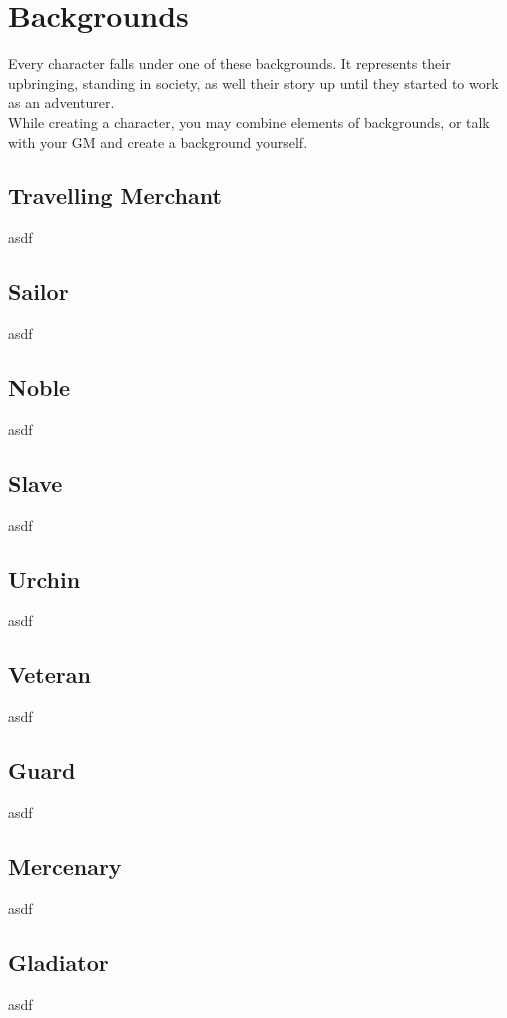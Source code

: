\chapter{Backgrounds}
Every character falls under one of these backgrounds. It represents their upbringing, standing in society, as well their story up until they started to work as an adventurer. \\
While creating a character, you may combine elements of backgrounds, or talk with your GM and create a background yourself.\\

\section{Travelling Merchant}
asdf

\section{Sailor}
asdf

\section{Noble}
asdf

\section{Slave}
asdf

\section{Urchin}
asdf

\section{Veteran}
asdf

\section{Guard}
asdf

\section{Mercenary}
asdf

\section{Gladiator}
asdf

